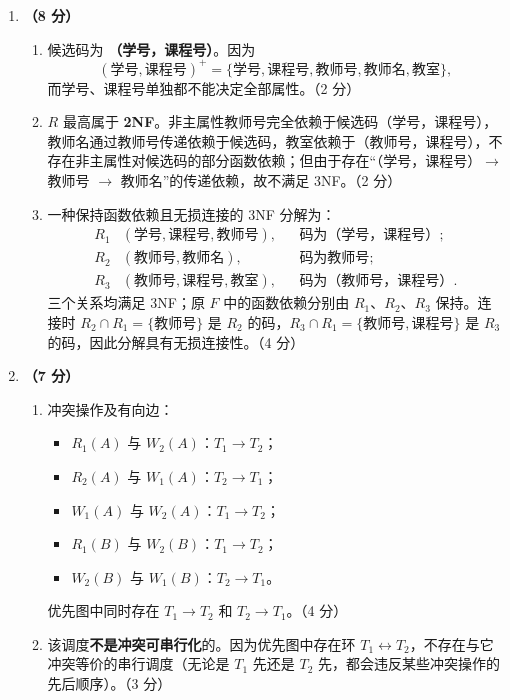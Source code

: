 \documentclass[a4paper,11pt]{article}
\begin{document}
\begin{enumerate}[start=21, label=\textbf{\arabic*.}, leftmargin=2.4em, itemsep=0.45em]
\item \textbf{（8 分）}
\begin{enumerate}[label=（\arabic*）, leftmargin=2.2em, itemsep=2pt]
  \item 候选码为 \textbf{（学号，课程号）}。因为
  \[
  (\text{学号},\text{课程号})^{+}
  =\{\text{学号},\text{课程号},\text{教师号},\text{教师名},\text{教室}\},
  \]
  而学号、课程号单独都不能决定全部属性。\hfill（2 分）

  \item $R$ 最高属于 \textbf{2NF}。非主属性教师号完全依赖于候选码（学号，课程号），教师名通过教师号传递依赖于候选码，教室依赖于（教师号，课程号），不存在非主属性对候选码的部分函数依赖；但由于存在“（学号，课程号）$\to$ 教师号 $\to$ 教师名”的传递依赖，故不满足 3NF。\hfill（2 分）

  \item 一种保持函数依赖且无损连接的 3NF 分解为：
  \[
  \begin{aligned}
  R_1&(\text{学号},\text{课程号},\text{教师号}), &&\text{码为（学号，课程号）};\\
  R_2&(\text{教师号},\text{教师名}), &&\text{码为教师号};\\
  R_3&(\text{教师号},\text{课程号},\text{教室}), &&\text{码为（教师号，课程号）}.
  \end{aligned}
  \]
  三个关系均满足 3NF；原 $F$ 中的函数依赖分别由 $R_1$、$R_2$、$R_3$ 保持。连接时 $R_2\cap R_1=\{\text{教师号}\}$ 是 $R_2$ 的码，$R_3\cap R_1=\{\text{教师号},\text{课程号}\}$ 是 $R_3$ 的码，因此分解具有无损连接性。\hfill（4 分）
\end{enumerate}

\item \textbf{（7 分）}
\begin{enumerate}[label=（\arabic*）, leftmargin=2.2em, itemsep=2pt]
  \item 冲突操作及有向边：
  \begin{itemize}[leftmargin=1.8em, itemsep=1pt]
    \item $R_1(A)$ 与 $W_2(A)$：$T_1\to T_2$；
    \item $R_2(A)$ 与 $W_1(A)$：$T_2\to T_1$；
    \item $W_1(A)$ 与 $W_2(A)$：$T_1\to T_2$；
    \item $R_1(B)$ 与 $W_2(B)$：$T_1\to T_2$；
    \item $W_2(B)$ 与 $W_1(B)$：$T_2\to T_1$。
  \end{itemize}
  优先图中同时存在 $T_1\to T_2$ 和 $T_2\to T_1$。\hfill（4 分）

  \item 该调度\textbf{不是冲突可串行化}的。因为优先图中存在环 $T_1\leftrightarrow T_2$，不存在与它冲突等价的串行调度（无论是 $T_1$ 先还是 $T_2$ 先，都会违反某些冲突操作的先后顺序）。\hfill（3 分）
\end{enumerate}

\end{enumerate}
\end{document}
